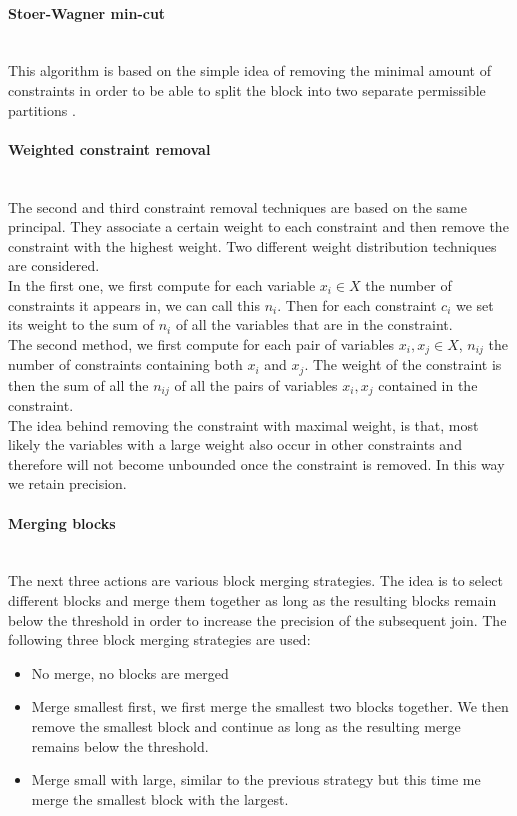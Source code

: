 \paragraph{Stoer-Wagner min-cut}\mbox{}\\
This algorithm is based on the simple idea of removing the minimal amount of constraints in order to be able to split the block into two separate permissible partitions \cite{stoer1997simple}.
\paragraph{Weighted constraint removal}\mbox{}\\
The second and third constraint removal techniques are based on the same principal. They associate a certain weight to each constraint and then remove the constraint with the highest weight. Two different weight distribution techniques are considered. \\
In the first one, we first compute for each variable $x_i \in X$ the number of constraints it appears in, we can call this $n_i$. Then for each constraint $c_i$ we set its weight to the sum of $n_i$ of all the variables that are in the constraint.\\
The second method, we first compute for each pair of variables $x_i,x_j\in X$, $n_{ij}$ the number of constraints containing both $x_i$ and $x_j$. The weight of the constraint is then the sum of all the $n_{ij}$ of all the pairs of variables $x_i,x_j$ contained in the constraint.\\
The idea behind removing the constraint with maximal weight, is that, most likely the variables with a large weight also occur in other constraints and therefore will not become unbounded once the constraint is removed. In this way we retain precision.
\paragraph{Merging blocks}\mbox{}\\
The next three actions are various block merging strategies. The idea is to select different blocks and merge them together as long as the resulting blocks remain below the threshold in order to increase the precision of the subsequent join. The following three block merging strategies are used:
\begin{itemize}
	\item No merge, no blocks are merged
	\item Merge smallest first, we first merge the smallest two blocks together. We then remove the smallest block and continue as long as the resulting merge remains below the threshold.
	\item Merge small with large, similar to the previous strategy but this time me merge the smallest block with the largest.
\end{itemize}

